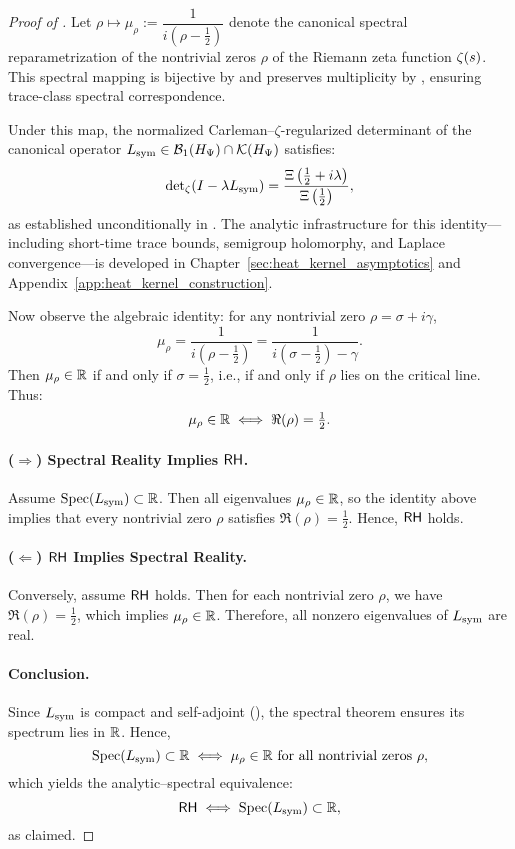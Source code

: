 \begin{proof}[Proof of ]
Let \( \rho \mapsto \mu_\rho := \dfrac{1}{i(\rho - \tfrac{1}{2})} \) denote the canonical spectral reparametrization of the nontrivial zeros \( \rho \) of the Riemann zeta function \( \zeta(s) \). This spectral mapping is bijective by  and preserves multiplicity by , ensuring trace-class spectral correspondence.

\medskip

Under this map, the normalized Carleman–\(\zeta\)-regularized determinant of the canonical operator \( L_{\mathrm{sym}} \in \mathcal{B}_1(H_{\Psi}) \cap \mathcal{K}(H_{\Psi}) \) satisfies:
\[
\det\nolimits_\zeta(I - \lambda L_{\mathrm{sym}}) = \frac{\Xi\left( \tfrac{1}{2} + i\lambda \right)}{\Xi\left( \tfrac{1}{2} \right)},
\]
as established unconditionally in . The analytic infrastructure for this identity—including short-time trace bounds, semigroup holomorphy, and Laplace convergence—is developed in Chapter~\ref{sec:heat_kernel_asymptotics} and Appendix~\ref{app:heat_kernel_construction}.

\medskip

Now observe the algebraic identity: for any nontrivial zero \( \rho = \sigma + i\gamma \),
\[
\mu_\rho = \frac{1}{i(\rho - \tfrac{1}{2})} = \frac{1}{i(\sigma - \tfrac{1}{2}) - \gamma}.
\]
Then \( \mu_\rho \in \mathbb{R} \) if and only if \( \sigma = \tfrac{1}{2} \), i.e., if and only if \( \rho \) lies on the critical line. Thus:
\[
\mu_\rho \in \mathbb{R} \iff \Re(\rho) = \tfrac{1}{2}.
\]

\paragraph*{(\( \Rightarrow \)) Spectral Reality Implies \( \mathsf{RH} \).}
Assume \( \operatorname{Spec}(L_{\mathrm{sym}}) \subset \mathbb{R} \). Then all eigenvalues \( \mu_\rho \in \mathbb{R} \), so the identity above implies that every nontrivial zero \( \rho \) satisfies \( \Re(\rho) = \tfrac{1}{2} \). Hence, \( \mathsf{RH} \) holds.

\paragraph*{(\( \Leftarrow \)) \( \mathsf{RH} \) Implies Spectral Reality.}
Conversely, assume \( \mathsf{RH} \) holds. Then for each nontrivial zero \( \rho \), we have \( \Re(\rho) = \tfrac{1}{2} \), which implies \( \mu_\rho \in \mathbb{R} \). Therefore, all nonzero eigenvalues of \( L_{\mathrm{sym}} \) are real.

\paragraph*{Conclusion.}
Since \( L_{\mathrm{sym}} \) is compact and self-adjoint (), the spectral theorem ensures its spectrum lies in \( \mathbb{R} \). Hence,
\[
\operatorname{Spec}(L_{\mathrm{sym}}) \subset \mathbb{R} \iff \mu_\rho \in \mathbb{R} \text{ for all nontrivial zeros } \rho,
\]
which yields the analytic–spectral equivalence:
\[
\mathsf{RH} \iff \operatorname{Spec}(L_{\mathrm{sym}}) \subset \mathbb{R},
\]
as claimed.
\end{proof}
